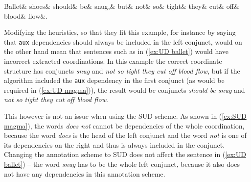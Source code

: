 \begin{adjustwidth}{-20pt}{20pt}
\begin{exe}
\ex\label{ex:UD ballet}
\begin{dependency}[hide label, baseline=-\the\dimexpr\fontdimen22\textfont2\relax]
    \begin{deptext}
        Ballet\& shoes\& should\& be\& snug,\& but\& not\& so\& tight\& they\& cut\& off\& blood\& flow\&.\footnotemark\\
    \end{deptext}
\end{dependency}
\end{exe}
\end{adjustwidth}

Modifying the heuristics, so that they fit this example, for instance by saying that \texttt{aux} dependencies should always be included in the left conjunct, would on the other hand mean that sentences such as in (\ref{ex:UD ballet}) would have incorrect extracted coordinations. In this example the correct coordinate structure has conjuncts \textsl{snug} and \textsl{not so tight they cut off blood flow}, but if the algorithm included the \texttt{aux} dependency in the first conjunct (as would be required in (\ref{ex:UD magma})), the result would be conjuncts \textsl{should be snug} and \textsl{not so tight they cut off blood flow}.

This however is not an issue when using the SUD scheme. As shown in (\ref{ex:SUD magma}), the words \textsl{does not} cannot be dependencies of the whole coordination, because the word \textsl{does} is the head of the left conjunct and the word \textsl{not} is one of its dependencies on the right and thus is always included in the conjunct. Changing the annotation scheme to SUD does not affect the sentence in (\ref{ex:UD ballet}) -- the word \textsl{snug} has to be the whole left conjunct, because it also does not have any dependencies in this annotation scheme.


